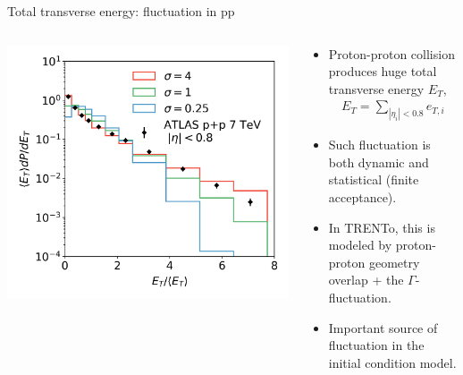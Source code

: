\documentclass[11pt, aspectratio=169]{beamer}
\begin{document}
\begin{frame}{Total transverse energy: fluctuation in pp}
\begin{columns}
\begin{column}{.4\textwidth}
\includegraphics[width=\textwidth]{kdep.png}
\end{column}
\begin{column}{.6\textwidth}
\begin{itemize}
\item Proton-proton collision produces huge total transverse energy $E_T$,
\begin{eqnarray}
\nonumber
E_T = \sum_{|\eta_i|<0.8} e_{T,i}
\end{eqnarray}
\item Such fluctuation is both dynamic and statistical (finite acceptance).
\item In TRENTo, this is modeled by proton-proton geometry overlap + the $\Gamma$-fluctuation.
\item Important source of fluctuation in the initial condition model.
\end{itemize}
\end{column}
\end{columns}
\end{frame}
\end{document}
